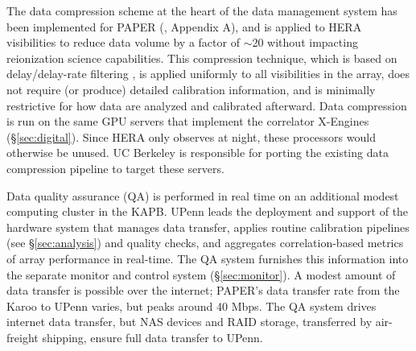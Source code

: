 \documentclass[preprint]{aastex}
\newcommand{\Mycitep}[1]{{\bf \citep{#1}}}
\newcommand{\Mycitealt}[1]{{\bf \citealt{#1}}}
\begin{document}

The data compression scheme at the heart of the data management system
has been implemented for PAPER (\Mycitealt{parsons_et_al2013},
Appendix A), and is applied to HERA visibilities to reduce data volume by
a factor of $\sim$20 without impacting reionization science
capabilities.  This compression technique, which is based on delay/delay-rate
filtering \Mycitep{parsons_backer2009}, is applied uniformly to all visibilities
in the array, does not require (or produce) detailed calibration
information, and is minimally restrictive for how data are analyzed and calibrated afterward.
Data compression is run on the same GPU servers
that implement the correlator X-Engines (\S\ref{sec:digital}).  Since HERA only observes at night,
these processors would otherwise be unused.  UC Berkeley is responsible for porting
the existing data compression pipeline to target these servers.

Data quality assurance (QA) is performed in real time on an additional modest 
computing cluster in the
KAPB.  UPenn leads the deployment and support of the hardware system that
manages data transfer, applies routine calibration pipelines (see \S\ref{sec:analysis}) and quality
checks, and aggregates correlation-based metrics of array performance in real-time.  The QA system
furnishes this information into the separate monitor and control system (\S\ref{sec:monitor}).
A modest amount of data transfer is possible over the internet; PAPER's data transfer rate from the Karoo
to UPenn varies, but peaks around 40 Mbps.  The QA system drives internet data transfer, but
NAS devices and RAID storage, transferred by air-freight shipping, ensure full data transfer to UPenn.

\end{document}
